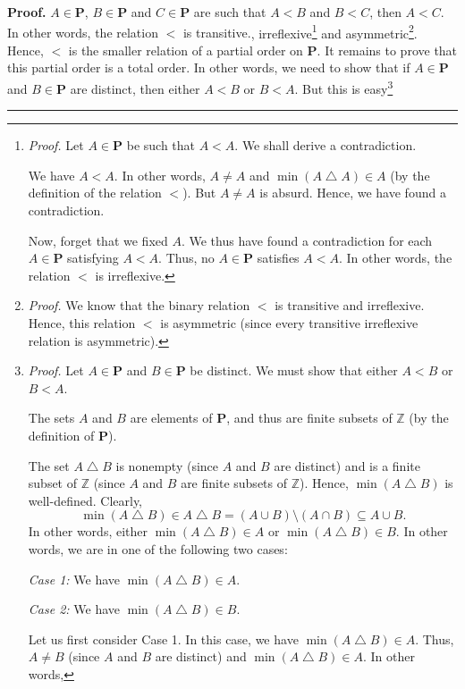 \documentclass[numbers=enddot,12pt,final,onecolumn,notitlepage]{scrartcl}%
\theoremstyle{definition}
\newenvironment{proof}[1][Proof]{\noindent\textbf{#1.} }{\ \rule{0.5em}{0.5em}}
\newenvironment{verlong}{}{}
\begin{document}
\begin{verlong}
\begin{proof}
{$A\in\mathbf{P}$, $B\in\mathbf{P}$ and $C\in\mathbf{P}$ are such that $A<B$
and $B<C$, then $A<C$. In other words, the relation $<$ is transitive.},
irreflexive\footnote{\textit{Proof.} Let $A\in\mathbf{P}$ be such that $A<A$.
We shall derive a contradiction.
\par
We have $A<A$. In other words, $A\neq A$ and $\min\left(  A\bigtriangleup
A\right)  \in A$ (by the definition of the relation $<$). But $A\neq A$ is
absurd. Hence, we have found a contradiction.
\par
Now, forget that we fixed $A$. We thus have found a contradiction for each
$A\in\mathbf{P}$ satisfying $A<A$. Thus, no $A\in\mathbf{P}$ satisfies $A<A$.
In other words, the relation $<$ is irreflexive.} and
asymmetric\footnote{\textit{Proof.} We know that the binary relation $<$ is
transitive and irreflexive. Hence, this relation $<$ is asymmetric (since
every transitive irreflexive relation is asymmetric).}. Hence, $<$ is the
smaller relation of a partial order on $\mathbf{P}$. It remains to prove that
this partial order is a total order. In other words, we need to show that if
$A\in\mathbf{P}$ and $B\in\mathbf{P}$ are distinct, then either $A<B$ or
$B<A$. But this is easy\footnote{\textit{Proof.} Let $A\in\mathbf{P}$ and
$B\in\mathbf{P}$ be distinct. We must show that either $A<B$ or $B<A$.
\par
The sets $A$ and $B$ are elements of $\mathbf{P}$, and thus are finite subsets
of $\mathbb{Z}$ (by the definition of $\mathbf{P}$).
\par
The set $A\bigtriangleup B$ is nonempty (since $A$ and $B$ are distinct) and
is a finite subset of $\mathbb{Z}$ (since $A$ and $B$ are finite subsets of
$\mathbb{Z}$). Hence, $\min\left(  A\bigtriangleup B\right)  $ is
well-defined. Clearly,%
\[
\min\left(  A\bigtriangleup B\right)  \in A\bigtriangleup B=\left(  A\cup
B\right)  \setminus\left(  A\cap B\right)  \subseteq A\cup B.
\]
In other words, either $\min\left(  A\bigtriangleup B\right)  \in A$ or
$\min\left(  A\bigtriangleup B\right)  \in B$. In other words, we are in one
of the following two cases:
\par
\textit{Case 1:} We have $\min\left(  A\bigtriangleup B\right)  \in A$.
\par
\textit{Case 2:} We have $\min\left(  A\bigtriangleup B\right)  \in B$.
\par
Let us first consider Case 1. In this case, we have $\min\left(
A\bigtriangleup B\right)  \in A$. Thus, $A\neq B$ (since $A$ and $B$ are
distinct) and $\min\left(  A\bigtriangleup B\right)  \in A$. In other words,
}
\end{proof}
\end{verlong}
\end{document}
